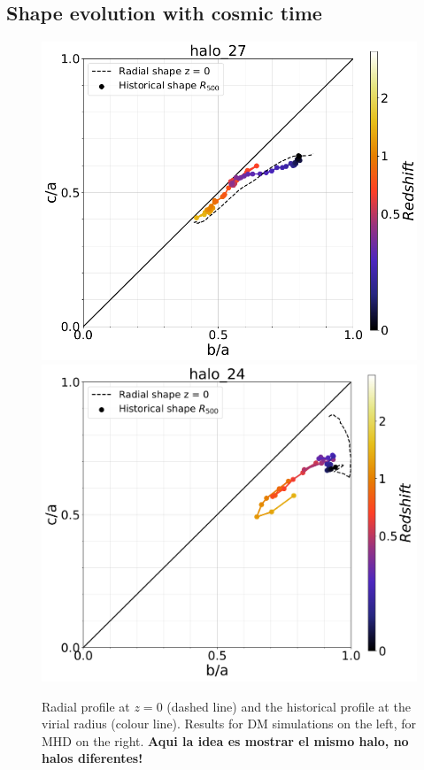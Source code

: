\documentclass[a4paper,fleqn,usenatbib]{mnras}
\begin{document}
\subsection{Shape evolution with cosmic time}


\begin{figure}
  \includegraphics[width=\columnwidth]{./pics/Redshift/halo_27_DM_Z_correlation.png}
  \includegraphics[width=\columnwidth]{./pics/Redshift/halo_24_level3_MHD_Z_Triax.png}
  \caption{Radial profile at $z=0$ (dashed line) and 
    the historical profile at the virial radius (colour line). 
    Results for DM simulations on the left, for MHD on the right.
    {\bf Aqui la idea es mostrar el mismo
      halo, no halos diferentes!}} 
  \label{fig:redshift_triaxial}
\end{figure}
\end{document}
